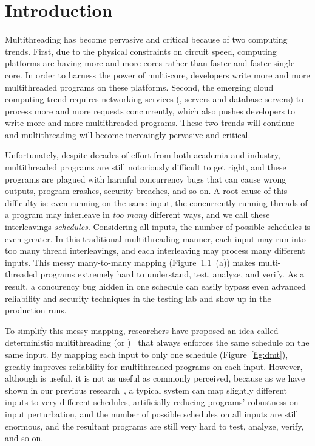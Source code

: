 \chapter{Introduction} \label{sec:intro}

Multithreading has become pervasive and critical because of two computing
trends. First, due to the physical constraints on circuit speed, computing
platforms are having more and more cores rather than faster and faster
single-core. In order to harness the power of multi-core, developers write more
and more multithreaded programs on these platforms. Second, the emerging cloud
computing trend requires networking services (\eg, \http servers and database
servers) to process more and more requests concurrently, which also pushes
developers to write more and more multithreaded programs. These two trends will
continue and multithreading will become increaingly pervasive and critical.

Unfortunately, despite decades of effort from both academia and industry,
multithreaded programs are still notoriously difficult to get right, and these
programs are plagued with harmful concurrency bugs that can cause wrong outputs,
program crashes, security breaches, and so on. A root cause of this difficulty
is: even running on the same input, the concurrently running threads of a
program may interleave in \emph{too many} different ways, and we call these
interleavings \emph{schedules}. Considering all inputs, the number of possible
schedules is even greater. In this traditional multithreading manner, each
input may run into too many thread interleavings, and each interleaving may
process many different inputs. This messy many-to-many mapping
(Figure~1.1~(a)) makes multi-threaded programs extremely hard to
understand, test, analyze, and verify. As a result, a concurency bug hidden in
one schedule can easily bypass even advanced reliability and security techniques
in the testing lab and show up in the production runs.

To simplify this messy mapping, researchers have proposed an idea called
deterministic multithreading (or \dmt)~\cite{dthreads:sosp11, dpj:oopsla09,
dmp:asplos09, kendo:asplos09, coredet:asplos10} that always enforces the same
schedule on the same input. By mapping each input to only one schedule
(Figure~\ref{fig:dmt}), \dmt greatly improves reliability for multithreaded
programs on each input. However, although \dmt is useful, it is not as useful as
commonly perceived, because as we have shown in our previous
research~\cite{cui:tern:osdi10}, a typical \dmt system can map slightly
different inputs to very different schedules, artificially reducing programs'
robustness on input perturbation, and the number of possible schedules on all
inputs are still enormous, and the resultant programs are still very hard to
test, analyze, verify, and so on.

